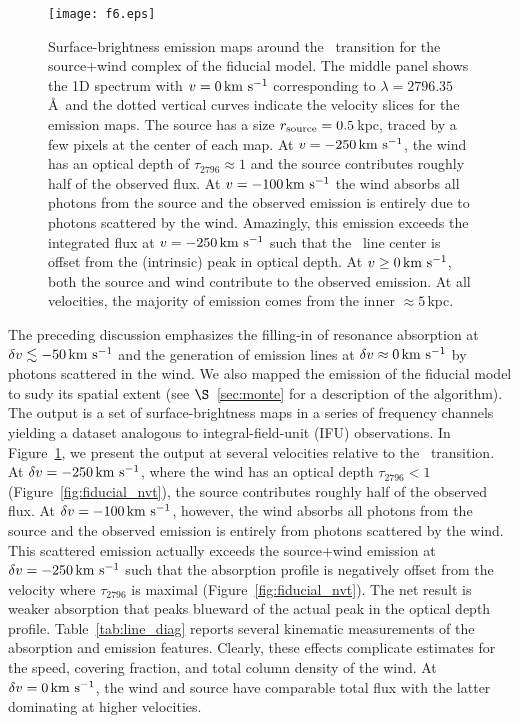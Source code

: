 \documentclass[]{emulateapj}
\begin{document}
\begin{figure}
\texttt{[image: f6.eps]}
\caption{
Surface-brightness emission maps around the \mgiia\ transition for the
source+wind complex of the fiducial model.  The middle panel shows the
1D spectrum with $v=0 
\, {\rm km~s^{-1}}$ corresponding to $\lambda = 2796.35$\AA\ and the dotted vertical
curves indicate the velocity slices for the emission maps.  The
source has a size $r_{\rm source} = 0.5$\,kpc, traced by a few
pixels at the center of each map.   At $v=-250 \, {\rm km~s^{-1}}$, the wind has an optical
depth of $\tau_{2796} \approx 1$ and the source contributes
roughly half of the observed flux.  At $v=-100 \, {\rm km~s^{-1}}$ the
wind absorbs all photons from the source and the observed emission is
entirely due to photons scattered by the wind.  Amazingly, this
emission exceeds the integrated flux at $v = -250\, {\rm km~s^{-1}}$ such that the
\mgiia\ line center is offset from the (intrinsic) peak in optical depth.  At $v \ge 0
\, {\rm km~s^{-1}}$,  both the source and wind contribute to the observed emission.
At all velocities, the majority of emission comes from the inner
$\approx 5$\,kpc.
}
\label{fig:fiducial_ifu_mgii}
\end{figure}



The preceding discussion emphasizes the filling-in of resonance
absorption at $\delta v
\lesssim -50 \, {\rm km~s^{-1}}$ and the generation of emission lines at $\delta v \approx
0 \, {\rm km~s^{-1}}$ by photons scattered in the wind.  We also
mapped the emission of the fiducial
model to sudy its spatial extent (see $\S$~\ref{sec:monte} for a description of the algorithm).
The output is a set of surface-brightness maps in a series of 
frequency channels yielding a
dataset analogous to integral-field-unit (IFU) observations.  In
Figure~\ref{fig:fiducial_ifu_mgii}, we present the output 
at several velocities relative to the \mgiia\
transition. At $\delta v = -250 \, {\rm km~s^{-1}}$, where the wind has an optical
depth $\tau_{2796} < 1$ (Figure~\ref{fig:fiducial_nvt}),
the source contributes roughly half of the observed flux.  
At $\delta v=-100 \, {\rm km~s^{-1}}$, however, the
wind absorbs all photons from the source and the observed emission is
entirely from photons scattered by the wind.  This scattered emission
actually exceeds the source+wind emission at 
$\delta v = -250 \, {\rm km~s^{-1}}$ such that the absorption profile is
negatively offset from the velocity where $\tau_{2796}$ is maximal
(Figure~\ref{fig:fiducial_nvt}).
The net result is
weaker  absorption that peaks blueward of the actual peak in the
optical depth profile.  
Table~\ref{tab:line_diag} reports several kinematic measurements of
the absorption and emission features.
Clearly, these effects complicate estimates for the
speed, covering fraction, and total column density of the wind.  At
$\delta v = 0 \, {\rm km~s^{-1}}$, the wind and source have comparable total flux with the
latter dominating at higher velocities.  
\end{document}
